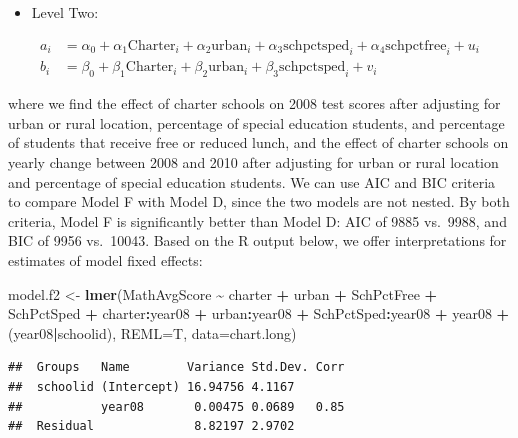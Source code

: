 \documentclass[
]{krantz}
\newenvironment{Shaded}{\begin{snugshade}}{\end{snugshade}}
\newcommand{\AttributeTok}[1]{\textcolor[rgb]{0.27,0.27,0.27}{#1}}
\newcommand{\FunctionTok}[1]{\textcolor[rgb]{0.27,0.27,0.27}{\textbf{#1}}}
\newcommand{\NormalTok}[1]{#1}
\newcommand{\OtherTok}[1]{\textcolor[rgb]{0.37,0.37,0.37}{#1}}
\newcommand{\SpecialCharTok}[1]{\textcolor[rgb]{0.43,0.43,0.43}{\textbf{#1}}}
\providecommand{\tightlist}{%
  \setlength{\itemsep}{0pt}\setlength{\parskip}{0pt}}
\begin{document}
\begin{itemize}
\tightlist
\item
  Level Two:
\end{itemize}

\begin{align*}
a_{i} & = \alpha_{0} + \alpha_{1}\textrm{Charter}_i + \alpha_{2}\textrm{urban}_i + \alpha_{3}\textrm{schpctsped}_i + \alpha_{4}\textrm{schpctfree}_i + u_{i} \\
b_{i} & = \beta_{0} + \beta_{1}\textrm{Charter}_i + \beta_{2}\textrm{urban}_i + \beta_{3}\textrm{schpctsped}_i + v_{i}
\end{align*}

where we find the effect of charter schools on 2008 test scores after adjusting for urban or rural location, percentage of special education students, and percentage of students that receive free or reduced lunch, and the effect of charter schools on yearly change between 2008 and 2010 after adjusting for urban or rural location and percentage of special education students. We can use AIC and BIC criteria to compare Model F with Model D, since the two models are not nested. By both criteria, Model F is significantly better than Model D: AIC of 9885 vs.~9988, and BIC of 9956 vs.~10043. Based on the R output below, we offer interpretations for estimates of model fixed effects:

\begin{Shaded}
\begin{Highlighting}[]
\NormalTok{model.f2 }\OtherTok{\textless{}{-}} \FunctionTok{lmer}\NormalTok{(MathAvgScore }\SpecialCharTok{\textasciitilde{}}\NormalTok{ charter }\SpecialCharTok{+}\NormalTok{ urban }\SpecialCharTok{+}\NormalTok{ SchPctFree }\SpecialCharTok{+} 
\NormalTok{  SchPctSped }\SpecialCharTok{+}\NormalTok{ charter}\SpecialCharTok{:}\NormalTok{year08 }\SpecialCharTok{+}\NormalTok{ urban}\SpecialCharTok{:}\NormalTok{year08 }\SpecialCharTok{+} 
\NormalTok{  SchPctSped}\SpecialCharTok{:}\NormalTok{year08 }\SpecialCharTok{+}\NormalTok{ year08 }\SpecialCharTok{+}
\NormalTok{  (year08}\SpecialCharTok{|}\NormalTok{schoolid), }\AttributeTok{REML=}\NormalTok{T, }\AttributeTok{data=}\NormalTok{chart.long)}
\end{Highlighting}
\end{Shaded}

\begin{verbatim}
##  Groups   Name        Variance Std.Dev. Corr
##  schoolid (Intercept) 16.94756 4.1167       
##           year08       0.00475 0.0689   0.85
##  Residual              8.82197 2.9702
\end{verbatim}
\end{document}
